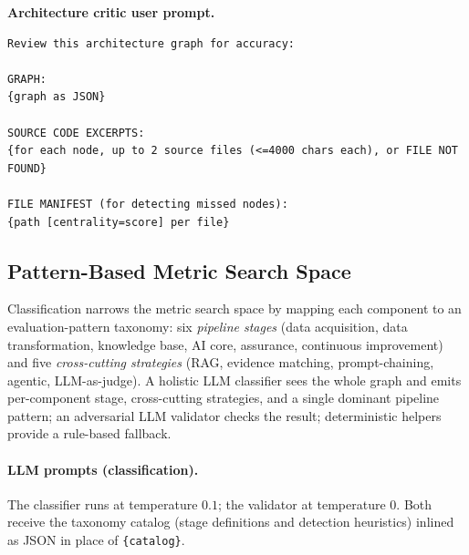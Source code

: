 \documentclass[11pt]{article}
\newcommand{\promptlabel}[1]{\vspace{2pt}\noindent\textbf{\small #1}\par\nobreak\vspace{1pt}}
\begin{document}
\promptlabel{Architecture critic user prompt.}
\begin{lstlisting}[style=prompt]
Review this architecture graph for accuracy:

GRAPH:
{graph as JSON}

SOURCE CODE EXCERPTS:
{for each node, up to 2 source files (<=4000 chars each), or FILE NOT FOUND}

FILE MANIFEST (for detecting missed nodes):
{path [centrality=score] per file}
\end{lstlisting}

\subsection{Pattern-Based Metric Search Space}
\label{app:impl-pattern}

Classification narrows the metric search space by mapping each component to an evaluation-pattern taxonomy: six \emph{pipeline stages} (data acquisition, data transformation, knowledge base, AI core, assurance, continuous improvement) and five \emph{cross-cutting strategies} (RAG, evidence matching, prompt-chaining, agentic, LLM-as-judge). A holistic LLM classifier sees the whole graph and emits per-component stage, cross-cutting strategies, and a single dominant pipeline pattern; an adversarial LLM validator checks the result; deterministic helpers provide a rule-based fallback.

\paragraph{LLM prompts (classification).} The classifier runs at temperature $0.1$; the validator at temperature $0$. Both receive the taxonomy catalog (stage definitions and detection heuristics) inlined as JSON in place of \texttt{\{catalog\}}.
\end{document}
